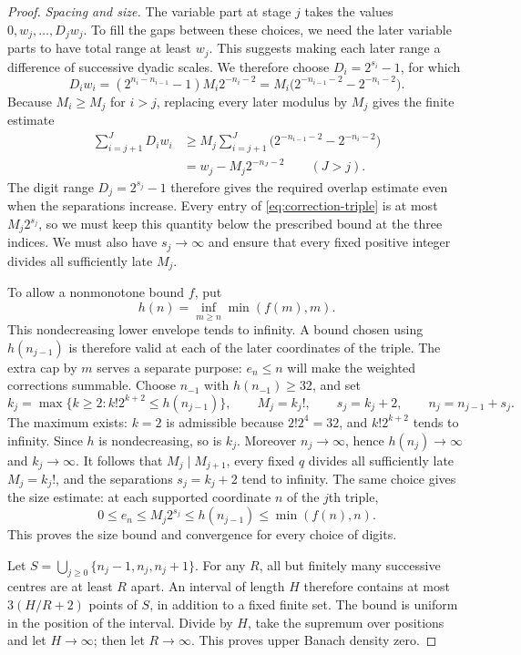 \documentclass[11pt]{article}
\begin{document}
\begin{proof}
\par\medskip\noindent\emph{Spacing and size.}
The variable part at stage $j$ takes the values $0,w_j,\ldots,D_jw_j$.
To fill the gaps between these choices, we need the later variable parts
to have total range at least $w_j$.  This suggests making each later
range a difference of successive dyadic scales.  We therefore choose
$D_i=2^{s_i}-1$, for which
\[
 D_iw_i=(2^{n_i-n_{i-1}}-1)M_i2^{-n_i-2}
       =M_i\bigl(2^{-n_{i-1}-2}-2^{-n_i-2}\bigr).
\]
Because $M_i\ge M_j$ for $i>j$, replacing every later modulus by $M_j$
gives the finite estimate
\begin{equation}\label{eq:finite-overlap}
 \begin{aligned}
 \sum_{i=j+1}^{J}D_iw_i
 &\ge M_j\sum_{i=j+1}^{J}
       \bigl(2^{-n_{i-1}-2}-2^{-n_i-2}\bigr)\\
 &=w_j-M_j2^{-n_J-2}\qquad(J>j).
 \end{aligned}
\end{equation}
The digit range $D_j=2^{s_j}-1$ therefore gives the required overlap
estimate even when the separations increase.  Every entry of
\eqref{eq:correction-triple} is at most $M_j2^{s_j}$, so we must keep this
quantity below the prescribed bound at the three indices.  We must also
have $s_j\to\infty$ and ensure that every fixed positive integer divides
all sufficiently late $M_j$.

To allow a nonmonotone bound $f$, put
\[
 h(n)=\inf_{m\ge n}\min(f(m),m).
\]
This nondecreasing lower envelope tends to infinity.  A bound chosen
using $h(n_{j-1})$ is therefore valid at each of the later coordinates
of the triple.  The extra cap by $m$ serves a separate purpose:
$e_n\le n$ will make the weighted corrections summable.
Choose $n_{-1}$ with $h(n_{-1})\ge32$, and set
\[
 k_j=\max\{k\ge2:k!2^{k+2}\le h(n_{j-1})\},\qquad
 M_j=k_j!,\qquad s_j=k_j+2,\qquad n_j=n_{j-1}+s_j.
\]
The maximum exists: $k=2$ is admissible because $2!2^4=32$, and
$k!2^{k+2}$ tends to infinity.  Since $h$ is nondecreasing, so is $k_j$.
Moreover $n_j\to\infty$, hence $h(n_j)\to\infty$ and $k_j\to\infty$.
It follows that $M_j\mid M_{j+1}$, every fixed $q$ divides all sufficiently
late $M_j=k_j!$, and the separations $s_j=k_j+2$ tend to infinity.
The same choice gives the size estimate: at each supported coordinate
$n$ of the $j$th triple,
\[
 0\le e_n\le M_j2^{s_j}\le h(n_{j-1})\le\min(f(n),n).
\]
This proves the size bound and convergence for every choice of digits.

Let $S=\bigcup_{j\ge0}\{n_j-1,n_j,n_j+1\}$.  For any $R$, all but
finitely many successive centres are at least $R$ apart.  An interval
of length $H$ therefore contains at most $3(H/R+2)$ points of $S$,
in addition to a fixed finite set.  The bound is uniform in the
position of the interval.  Divide by $H$, take the supremum over
positions and let $H\to\infty$; then let $R\to\infty$.
This proves upper Banach density zero.


\end{proof}
\end{document}
